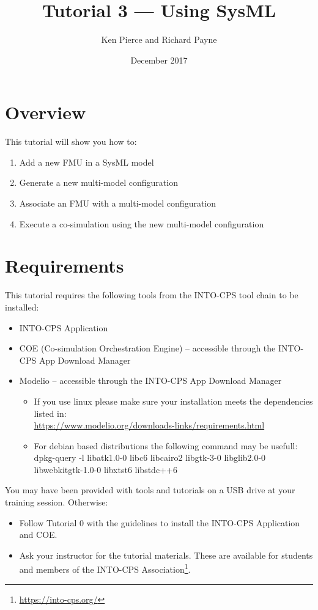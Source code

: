 \documentclass[11pt,a4paper]{../tutorial}
\title{Tutorial 3 --- Using SysML}
\date{December 2017}
\author{Ken Pierce and Richard Payne}
\begin{document}
\section*{Overview}

This tutorial will show you how to:

\begin{enumerate}[noitemsep]
\item Add a new FMU in a SysML model
\item Generate a new multi-model configuration
\item Associate an FMU with a multi-model configuration
\item Execute a co-simulation using the new multi-model configuration
\end{enumerate}

\section*{Requirements}

This tutorial requires the following tools from the INTO-CPS tool chain to be installed:

\begin{itemize}[noitemsep]
\item INTO-CPS Application
\item COE (Co-simulation Orchestration Engine) -- accessible through the INTO-CPS App Download Manager
\item Modelio -- accessible through the INTO-CPS App Download Manager
	\begin{small}
	\begin{itemize}
		\item If you use linux please make sure your installation meets the dependencies listed in:\\ \url{https://www.modelio.org/downloads-links/requirements.html}
		\item For debian based distributions the following command may be usefull:\\
		dpkg-query -l  libatk1.0-0 libc6 libcairo2 libgtk-3-0 libglib2.0-0 libwebkitgtk-1.0-0 libxtst6 libstdc++6
	\end{itemize}
	\end{small}
\end{itemize}

You may have been provided with tools and tutorials on a USB drive at your training session. Otherwise: 
\begin{itemize}[noitemsep]
\item Follow Tutorial 0 with the guidelines to install the INTO-CPS Application and COE.
\item Ask your instructor for the tutorial materials. These are available for students and members of the INTO-CPS Association\footnote{\url{https://into-cps.org/}}.
\end{itemize}
\end{document}
